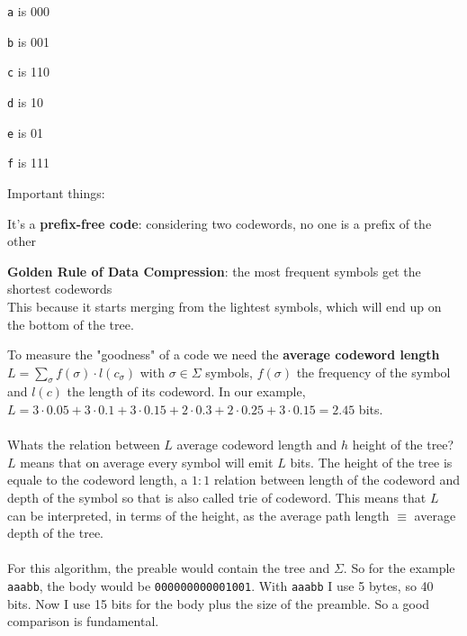 \documentclass[10pt]{report}
\begin{document}
\begin{list}{}{}
	\item \texttt{a} is 000
	\item \texttt{b} is 001
	\item \texttt{c} is 110
	\item \texttt{d} is 10 
	\item \texttt{e} is 01
	\item \texttt{f} is 111
\end{list}
Important things:\begin{list}{}{}
	\item It's a \textbf{prefix-free code}: considering two codewords, no one is a prefix of the other
	\item \textbf{Golden Rule of Data Compression}: the most frequent symbols get the shortest codewords\\
	This because it starts merging from the lightest symbols, which will end up on the bottom of the tree.
\end{list}
To measure the "goodness" of a code we need the \textbf{average codeword length} $L =\sum_\sigma f(\sigma)\cdot l(c_\sigma)$ with $\sigma\in\Sigma$ symbols, $f(\sigma)$ the frequency of the symbol and $l(c)$ the length of its codeword. In our example, $L = 3\cdot0.05 + 3\cdot0.1+3\cdot0.15+2\cdot0.3+2\cdot0.25+3\cdot0.15 = 2.45$ bits.\\\\
Whats the relation between $L$ average codeword length and $h$ height of the tree? $L$ means that on average every symbol will emit $L$ bits. The height of the tree is equale to the codeword length, a $1:1$ relation between length of the codeword and depth of the symbol so that is also called trie of codeword. This means that $L$ can be interpreted, in terms of the height, as the average path length $\equiv$ average depth of the tree.\\\\
For this algorithm, the preable would contain the tree and $\Sigma$. So for the example \texttt{aaabb}, the body would be \texttt{000000000001001}. With \texttt{aaabb} I use 5 bytes, so 40 bits. Now I use 15 bits for the body plus the size of the preamble. So a good comparison is fundamental.
\end{document}
